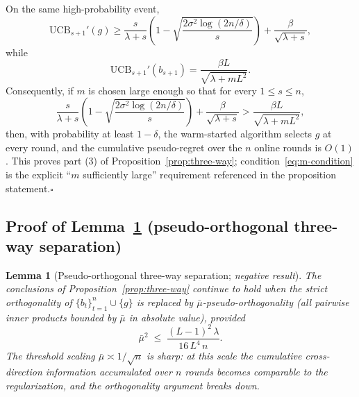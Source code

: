 \documentclass{article}
\newtheorem{lemma}{Lemma}
\theoremstyle{definition}
\theoremstyle{remark}
\theoremstyle{remark}
\begin{document}
On the same high-probability event,
\[
\mathrm{UCB}_{s+1}'(g)
\ge
\frac{s}{\lambda+s}
\left(
1-\sqrt{\frac{2\sigma^2\log(2n/\delta)}{s}}
\right)
+
\frac{\beta}{\sqrt{\lambda+s}},
\]
while
\[
\mathrm{UCB}_{s+1}'(b_{s+1})
=
\frac{\beta L}{\sqrt{\lambda+mL^2}}.
\]
Consequently, if $m$ is chosen large enough so that for every $1\le s\le n$,
\begin{equation}
\label{eq:m-condition}
\frac{s}{\lambda+s}
\left(
1-\sqrt{\frac{2\sigma^2\log(2n/\delta)}{s}}
\right)
+
\frac{\beta}{\sqrt{\lambda+s}}
>
\frac{\beta L}{\sqrt{\lambda+mL^2}},
\end{equation}
then, with probability at least $1-\delta$, the warm-started algorithm selects $g$ at every round, and the cumulative pseudo-regret over the $n$ online rounds is $O(1)$. This proves part (3) of Proposition~\ref{prop:three-way}; condition~\eqref{eq:m-condition} is the explicit ``$m$ sufficiently large'' requirement referenced in the proposition statement.\hfill$\square$

\subsection{Proof of Lemma~\ref{lem:pseudo-orth} (pseudo-orthogonal three-way separation)}
\label{app:proof-pseudo-orth}

\begin{lemma}[Pseudo-orthogonal three-way separation; \emph{negative result}]
\label{lem:pseudo-orth}
The conclusions of Proposition~\ref{prop:three-way} continue to hold
when the strict orthogonality of $\{b_t\}_{t=1}^n\cup\{g\}$ is replaced
by $\bar\mu$-pseudo-orthogonality (all pairwise inner products bounded
by $\bar\mu$ in absolute value), provided
\begin{equation}
\label{eq:pseudo-orth-cond}
\bar\mu^2 \;\le\; \frac{(L-1)^2\,\lambda}{16\,L^4\,n}.
\end{equation}
The threshold scaling $\bar\mu\asymp 1/\sqrt n$ is sharp: at this scale
the cumulative cross-direction information accumulated over $n$ rounds
becomes comparable to the regularization, and the orthogonality
argument breaks down.
\end{lemma}
\end{document}
